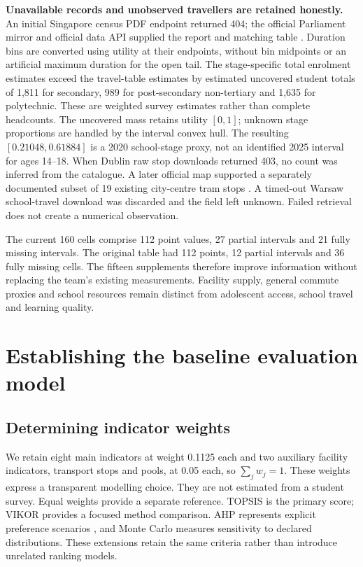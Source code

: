 \documentclass[12pt]{article}
\begin{document}
\textbf{Unavailable records and unobserved travellers are retained honestly.}
An initial Singapore census PDF endpoint returned 404; the official Parliament
mirror and official data API supplied the report and matching table
\cite{singapore}. Duration bins are converted using utility at their endpoints,
without bin midpoints or an artificial maximum duration for the open tail.
The stage-specific total enrolment estimates exceed the travel-table estimates
by estimated uncovered student totals of 1,811 for secondary, 989 for
post-secondary non-tertiary and 1,635 for polytechnic. These are weighted
survey estimates rather than complete headcounts. The uncovered mass retains
utility $[0,1]$; unknown stage proportions are
handled by the interval convex hull. The resulting $[0.21048,0.61884]$ is a
2020 school-stage proxy, not an identified 2025 interval for ages 14--18.
When Dublin raw stop downloads returned 403, no count was inferred from the
catalogue. A later official map supported a separately documented subset of
19 existing city-centre tram stops \cite{dublin}. A timed-out Warsaw school-travel download
was discarded and the field left unknown. Failed retrieval does not create a
numerical observation.

The current 160 cells comprise 112 point values, 27 partial intervals and
21 fully missing intervals. The original table had 112 points, 12 partial
intervals and 36 fully missing cells. The fifteen supplements therefore improve
information without replacing the team's existing measurements. Facility supply,
general commute proxies and school resources remain distinct from adolescent
access, school travel and learning quality.

\section{Establishing the baseline evaluation model}
\subsection{Determining indicator weights}
We retain eight main indicators at weight 0.1125 each and two auxiliary facility
indicators, transport stops and pools, at 0.05 each, so $\sum_jw_j=1$.
These weights express a transparent modelling choice. They are not estimated
from a student survey. Equal weights provide a separate reference.
TOPSIS is the primary score; VIKOR provides a focused method comparison.
AHP represents explicit preference scenarios \cite{saaty}, and Monte Carlo measures
sensitivity to declared distributions. These extensions retain the same
criteria rather than introduce unrelated ranking models.
\end{document}
